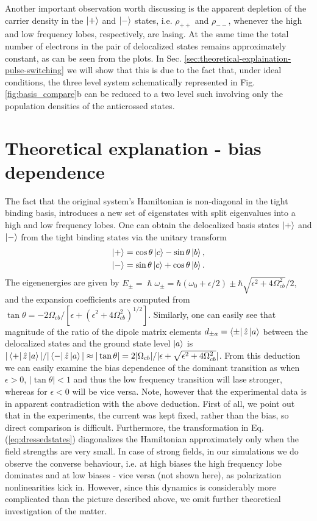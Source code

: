 \documentclass[]{spie}  %
\def\h{\hat}
\def\h{\hat}
\begin{document}
 Another important observation worth discussing is the apparent depletion of the carrier density in the $\ket{+}$ and $\ket{-}$ states, i.e. $\rho_{++}$ and $\rho_{--}$, whenever the high and low frequency lobes, respectively, are lasing. At the same time the total number of electrons in the pair of delocalized states remains approximately constant, as can be seen from the plots. In Sec. \ref{sec:theoretical-explaination-pulse-switching} we will show that this is due to the fact that, under ideal conditions, the three level system schematically represented in Fig. \ref{fig:basis_compare}b can be reduced to a two level such involving only the population densities of the anticrossed states. 

\section{Theoretical explanation - bias dependence}
\label{sec:theoretical-explaination-bias-dependence}
The fact that the original system's Hamiltonian is non-diagonal in the tight binding basis, introduces a new set of eigenstates with split eigenvalues into a high and low frequency lobes. One can obtain the delocalized basis states $\ket{+}$ and $\ket{-}$ from the tight binding states via the unitary transform
 \begin{align}
 \label{eq:dressedstates}
 \Ket{+} &= \cos\theta \Ket{c} - \sin\theta \Ket{b}, \nonumber \\
 \Ket{-} &= \sin\theta \Ket{c} + \cos\theta \Ket{b}.
 \end{align}
 The eigenenergies are given by
 $
 E_\pm =\hslash \omega_{\pm} =\hbar(\omega_0 +\epsilon/2) \pm \hbar \sqrt{\epsilon^2+4\Omega_{cb}^2}/2,
 $
 and the expansion coefficients are computed from  
 $
 \tan \theta = -2\Omega_{cb}/[\epsilon+(\epsilon^2+4\Omega_{cb}^2)^{1/2}].
 $
 Similarly, one can easily see that magnitude of the ratio of the dipole matrix elements $d_{\pm a} = \bra{\pm}\h z \ket{a}$ between the delocalized states and the ground state level $\ket{a}$ is $|\Bra{+}\hat{z}\Ket{a}|/|\Bra{-}\hat{z}\Ket{a} | \approx |\tan\theta| =  2|\Omega_{cb}|/|\epsilon+\sqrt{\epsilon^2+4\Omega_{cb}^2}|$. From this deduction we can easily examine the bias dependence of the dominant transition \cite{dupont2010simplified} as when $\epsilon >0$, $|\tan\theta|<1$ and thus the low frequency transition will lase stronger, whereas for $\epsilon < 0 $ will  be vice versa. Note, however that the experimental data is in apparent contradiction with the above deduction. First of all, we point out that in the experiments, the current was kept fixed, rather than the bias, so direct comparison is difficult. Furthermore, the transformation in Eq. (\ref{eq:dressedstates}) diagonalizes the Hamiltonian approximately only when the field strengths are very small. In case of strong fields, in our simulations we do observe the converse behaviour, i.e. at high biases the high frequency lobe dominates and at low biases - vice versa (not shown here), as polarization nonlinearities kick in. However, since this dynamics is considerably more complicated than the picture described above, we omit further theoretical investigation of the matter. 
\end{document}
